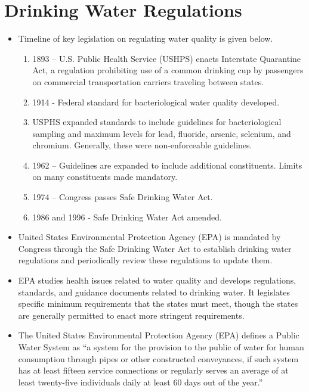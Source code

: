 \section{Drinking Water Regulations}
\begin{itemize}
\item Timeline of key legislation on regulating water quality is given below.
\begin{enumerate}
\item 1893 – U.S. Public Health Service (USHPS) enacts Interstate Quarantine Act, a regulation prohibiting use of a common drinking cup by passengers on commercial transportation carriers traveling between states.
\item 1914 - Federal standard for bacteriological water quality developed.
\item USPHS expanded standards to include guidelines for bacteriological sampling and maximum levels for lead, fluoride, arsenic, selenium, and chromium. Generally, these were non-enforceable guidelines.
\item 1962 – Guidelines are expanded to include additional constituents. Limits on many constituents made mandatory.
\item 1974 – Congress passes Safe Drinking Water Act.
\item 1986 and 1996 - Safe Drinking Water Act amended.
\end{enumerate}

\item United States Environmental Protection Agency (EPA)  is mandated by Congress through the Safe Drinking Water Act to establish drinking water regulations and periodically review these regulations to update them.

\item EPA studies health issues related to water quality and develops regulations, standards, and guidance documents related to drinking water. It legislates specific minimum requirements that the states must meet, though the states are generally permitted to enact more stringent requirements.

\item The United States Environmental Protection Agency (EPA) defines a Public Water System as “a system for the provision to the public of water for human consumption through pipes or other constructed conveyances, if such system has at least fifteen service connections or regularly serves an average of at least twenty-five individuals daily at least 60 days out of the year.”


\end{itemize}
